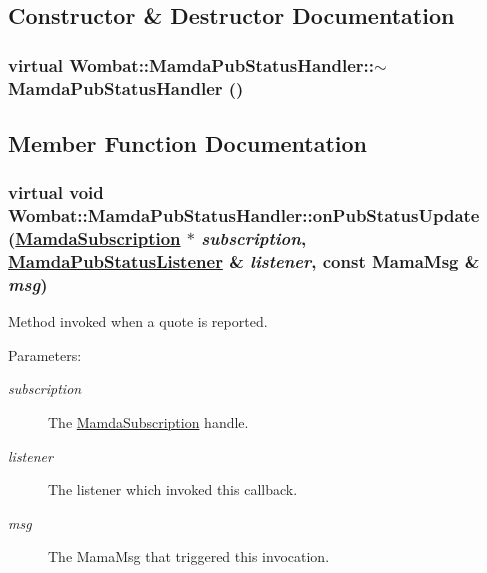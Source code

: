 \subsection{Constructor \& Destructor Documentation}
\hypertarget{classWombat_1_1MamdaPubStatusHandler_53e6f5da15ee115e3d2597e1bfcc2221}{
\subsubsection[$\sim$MamdaPubStatusHandler]{\setlength{\rightskip}{0pt plus 5cm}virtual Wombat::Mamda\-Pub\-Status\-Handler::$\sim$Mamda\-Pub\-Status\-Handler ()}}
\label{classWombat_1_1MamdaPubStatusHandler_53e6f5da15ee115e3d2597e1bfcc2221}




\subsection{Member Function Documentation}
\hypertarget{classWombat_1_1MamdaPubStatusHandler_8fecd04e098fbcc485dfb247082ace81}{
\subsubsection[onPubStatusUpdate]{\setlength{\rightskip}{0pt plus 5cm}virtual void Wombat::Mamda\-Pub\-Status\-Handler::on\-Pub\-Status\-Update (\hyperlink{classWombat_1_1MamdaSubscription}{Mamda\-Subscription} $\ast$ {\em subscription}, \hyperlink{classWombat_1_1MamdaPubStatusListener}{Mamda\-Pub\-Status\-Listener} \& {\em listener}, const Mama\-Msg \& {\em msg})}}
\label{classWombat_1_1MamdaPubStatusHandler_8fecd04e098fbcc485dfb247082ace81}


Method invoked when a quote is reported. 

\begin{Desc}
\item[Parameters:]
\begin{description}
\item[{\em subscription}]The \hyperlink{classWombat_1_1MamdaSubscription}{Mamda\-Subscription} handle. \item[{\em listener}]The listener which invoked this callback. \item[{\em msg}]The Mama\-Msg that triggered this invocation. \end{description}
\end{Desc}

